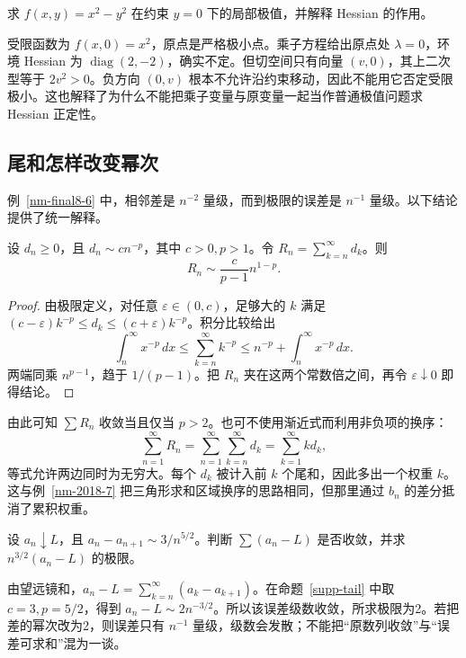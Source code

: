 \documentclass[12pt,fontset=fandol]{ctexart}
\begin{document}
\begin{example}
求 $f(x,y)=x^2-y^2$ 在约束 $y=0$ 下的局部极值，并解释 Hessian 的作用。
\end{example}
\begin{solve}
受限函数为 $f(x,0)=x^2$，原点是严格极小点。乘子方程给出原点处 $\lambda=0$，环境 Hessian 为 $\operatorname{diag}(2,-2)$，确实不定。但切空间只有向量 $(v,0)$，其上二次型等于 $2v^2>0$。负方向 $(0,v)$ 根本不允许沿约束移动，因此不能用它否定受限极小。这也解释了为什么不能把乘子变量与原变量一起当作普通极值问题求 Hessian 正定性。
\end{solve}

\subsection{尾和怎样改变幂次}
例~\ref{nm-final8-6} 中，相邻差是 $n^{-2}$ 量级，而到极限的误差是 $n^{-1}$ 量级。以下结论提供了统一解释。

\begin{proposition}[正项尾和渐近]\label{supp-tail}
设 $d_n\geq0$，且 $d_n\sim cn^{-p}$，其中 $c>0,p>1$。令 $R_n=\sum_{k=n}^\infty d_k$。则
\[
 R_n\sim\frac c{p-1}n^{1-p}.
\]
\end{proposition}
\begin{proof}
由极限定义，对任意 $\varepsilon\in(0,c)$，足够大的 $k$ 满足 $(c-\varepsilon)k^{-p}\leq d_k\leq(c+\varepsilon)k^{-p}$。积分比较给出
\[
 \int_n^\infty x^{-p}\,dx\leq\sum_{k=n}^\infty k^{-p}
 \leq n^{-p}+\int_n^\infty x^{-p}\,dx.
\]
两端同乘 $n^{p-1}$，趋于 $1/(p-1)$。把 $R_n$ 夹在这两个常数倍之间，再令 $\varepsilon\downarrow0$ 即得结论。
\end{proof}

由此可知 $\sum R_n$ 收敛当且仅当 $p>2$。也可不使用渐近式而利用非负项的换序：
\[
 \sum_{n=1}^\infty R_n
 =\sum_{n=1}^\infty\sum_{k=n}^\infty d_k
 =\sum_{k=1}^\infty k d_k,
\]
等式允许两边同时为无穷大。每个 $d_k$ 被计入前 $k$ 个尾和，因此多出一个权重 $k$。这与例~\ref{nm-2018-7} 把三角形求和区域换序的思路相同，但那里通过 $b_n$ 的差分抵消了累积权重。

\begin{example}
设 $a_n\downarrow L$，且 $a_n-a_{n+1}\sim3/n^{5/2}$。判断 $\sum(a_n-L)$ 是否收敛，并求 $n^{3/2}(a_n-L)$ 的极限。
\end{example}
\begin{solve}
由望远镜和，$a_n-L=\sum_{k=n}^\infty(a_k-a_{k+1})$。在命题~\ref{supp-tail} 中取 $c=3,p=5/2$，得到 $a_n-L\sim2n^{-3/2}$。所以该误差级数收敛，所求极限为2。若把差的幂次改为2，则误差只有 $n^{-1}$ 量级，级数会发散；不能把“原数列收敛”与“误差可求和”混为一谈。
\end{solve}
\end{document}
